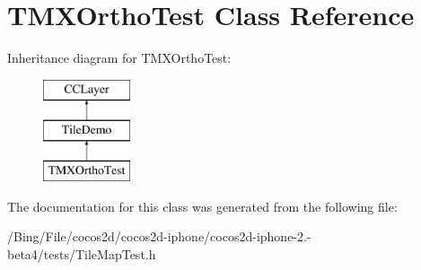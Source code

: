 \hypertarget{interface_t_m_x_ortho_test}{\section{T\-M\-X\-Ortho\-Test Class Reference}
\label{interface_t_m_x_ortho_test}
}
Inheritance diagram for T\-M\-X\-Ortho\-Test\-:\begin{figure}[H]
\begin{center}
\leavevmode
\includegraphics[height=3.000000cm]{interface_t_m_x_ortho_test}
\end{center}
\end{figure}


The documentation for this class was generated from the following file\-:\begin{DoxyCompactItemize}
\item 
/\-Bing/\-File/cocos2d/cocos2d-\/iphone/cocos2d-\/iphone-\/2.-\/beta4/tests/Tile\-Map\-Test.\-h\end{DoxyCompactItemize}
